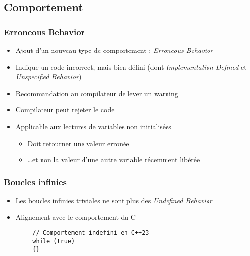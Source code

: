 \documentclass[C++.tex]{subfiles}
\begin{document}
\subsection*{Comportement}
\begin{frame}[fragile]
	\frametitle{Erroneous Behavior}
	\begin{itemize}
		\item Ajout d'un nouveau type de comportement : \textit{Erroneous Behavior}
		\item Indique un code incorrect, mais bien défini (dont \textit{Implementation Defined} et \textit{Unspecified Behavior})
		\item Recommandation au compilateur de lever un warning
		\item Compilateur peut rejeter le code
		\item Applicable aux lectures de variables non initialisées
		\begin{itemize}
			\item Doit retourner une valeur \og{}erronée\fg{}
			\item \ldots{}et non la valeur d'une autre variable récemment libérée
		\end{itemize}
	\end{itemize}

\end{frame}

\begin{frame}[fragile]
	\frametitle{Boucles infinies}
	\begin{itemize}
		\item Les boucles infinies triviales ne sont plus des \textit{Undefined Behavior}
		\item Alignement avec le comportement du C
	\end{itemize}

	\begin{verbatim}
		// Comportement indefini en C++23
		while (true)
		{}
	\end{verbatim}

\end{frame}
\end{document}
